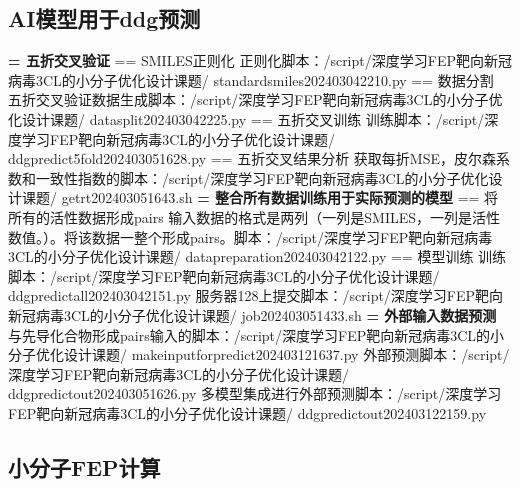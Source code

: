 \subsection{AI模型用于ddg预测}
\noindent\textbf{= 五折交叉验证}
\newline\noindent == SMILES正则化
\newline\indent 正则化脚本：/script/深度学习FEP靶向新冠病毒3CL的小分子优化设计课题/ standardsmiles202403042210.py
\newline\noindent == 数据分割
\newline\indent 五折交叉验证数据生成脚本：/script/深度学习FEP靶向新冠病毒3CL的小分子优化设计课题/ datasplit202403042225.py
\newline\noindent == 五折交叉训练
\newline\indent 训练脚本：/script/深度学习FEP靶向新冠病毒3CL的小分子优化设计课题/ ddgpredict5fold202403051628.py
\newline\noindent == 五折交叉结果分析
\newline\indent 获取每折MSE，皮尔森系数和一致性指数的脚本：/script/深度学习FEP靶向新冠病毒3CL的小分子优化设计课题/ getrt202403051643.sh
\newline\noindent\textbf{= 整合所有数据训练用于实际预测的模型}
\newline\noindent == 将所有的活性数据形成pairs
\newline\indent 输入数据的格式是两列（一列是SMILES，一列是活性数值。）。将该数据一整个形成pairs。脚本：/script/深度学习FEP靶向新冠病毒3CL的小分子优化设计课题/ datapreparation202403042122.py
\newline\noindent == 模型训练
\newline\indent 训练脚本：/script/深度学习FEP靶向新冠病毒3CL的小分子优化设计课题/ ddgpredictall202403042151.py
\newline\indent 服务器128上提交脚本：/script/深度学习FEP靶向新冠病毒3CL的小分子优化设计课题/ job202403051433.sh
\newline\noindent\textbf{= 外部输入数据预测}
\newline\indent 与先导化合物形成pairs输入的脚本：/script/深度学习FEP靶向新冠病毒3CL的小分子优化设计课题/ makeinputforpredict202403121637.py
\newline\indent 外部预测脚本：/script/深度学习FEP靶向新冠病毒3CL的小分子优化设计课题/ ddgpredictout202403051626.py
\newline\indent 多模型集成进行外部预测脚本：/script/深度学习FEP靶向新冠病毒3CL的小分子优化设计课题/ ddgpredictout202403122159.py
\subsection{小分子FEP计算}
